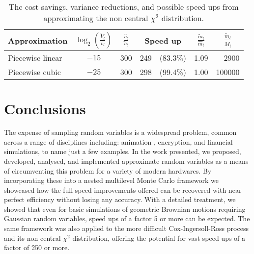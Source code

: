 \documentclass[manuscript,review]{acmart}
\begin{document}
\begin{table}[htb]
\centering
\caption{The cost savings, variance reductions, and possible speed ups from approximating the non central $ \chi^2 $ distribution.}
\label{tab:savings_chi}
\begin{tabular}{lcclrcr}
Approximation  & $ {\log}_2 \left(\tfrac{\widetilde{V}_l}{\hat{v}_l}\right) $ & $ \tfrac{\hat{c}_l}{\tilde{c}_l} $ & \multicolumn{2}{c}{Speed up} & $ \tfrac{\widetilde{m}_l}{\widehat{m}_l} $ & \multicolumn{1}{c}{$ \tfrac{\widetilde{m}_l}{\widetilde{M}_l} $} \\[0.5em]
\hline
Piecewise linear  & $ -15 $ & 300 & 249 & (83.3\%) & 1.09 & 2900 \\
Piecewise cubic  & $ -25 $ & 300 & 298 & (99.4\%)& 1.00 & 100000  
\end{tabular}
\end{table}

\section{Conclusions}
\label{sec:conclusions}

The expense of sampling random variables is a widespread problem, common across a range of disciplines including: animation \citep{lee2017vectorized}, encryption, and financial simulations, to name just a few examples. In the work presented, we proposed, developed, analysed, and implemented approximate random variables as a means of circumventing this problem for a variety of modern hardwares. By incorporating these into a nested multilevel Monte Carlo framework we showcased how the full speed improvements offered can be recovered with near perfect efficiency without losing any accuracy. With a detailed treatment, we showed that even for basic simulations of geometric Brownian motions requiring Gaussian random variables, speed ups of a factor 5 or more can be expected. The same framework was also applied to the more difficult Cox-Ingersoll-Ross process and its non central $ \chi^2 $ distribution, offering the potential for vast speed ups of a factor of 250 or more. 
\end{document}
